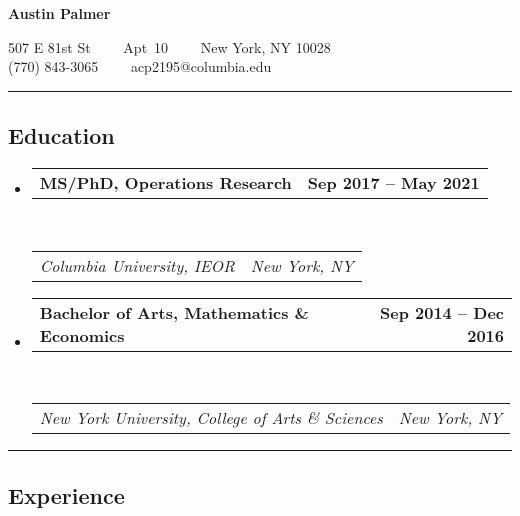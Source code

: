 \documentclass[11pt,letterpaper]{article}
\makeatletter
\newcommand{\headerrow}[2]
{\begin{tabular*}{\linewidth}{l@{\extracolsep{\fill}}r}
	#1 &
	#2 \\
\end{tabular*}}
\makeatother
\begin{document}
\begin{center}
{\LARGE \textbf{Austin Palmer}}
\vspace{0.2em}


507 E 81st St\ \ \textbullet
\ \ Apt\ 10\ \ \textbullet
\ \ New York, NY 10028
\\
(770) 843-3065\ \ \textbullet
\ \ acp2195@columbia.edu
\end{center}

\hrule
\vspace{-0.4em}

\subsection*{Education}

\begin{itemize}
	\parskip=0.1em

    \item[] 
	\headerrow
		{\textbf{MS/PhD, Operations Research}}
		{\textbf{Sep 2017 -- May 2021}}
	\\
	\headerrow
		{\emph{Columbia University, IEOR}}
		{\emph{New York, NY}}

    \item[] 
	\headerrow
        {\textbf{Bachelor of Arts, Mathematics \& Economics}}
		{\textbf{Sep 2014 -- Dec 2016}}
	\\
	\headerrow
        {\emph{New York University, College of Arts \& Sciences}}
		{\emph{New York, NY}}


\end{itemize}

\hrule
\vspace{-0.4em}

\subsection*{Experience}
\end{document}
